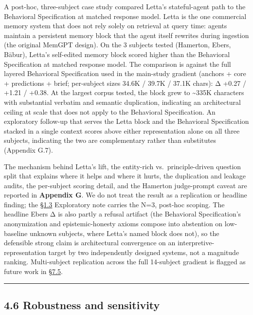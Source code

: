 A post-hoc, three-subject case study compared Letta's stateful-agent
path to the Behavioral Specification at matched response model. Letta is
the one commercial memory system that does not rely solely on retrieval
at query time: agents maintain a persistent memory block that the agent
itself rewrites during ingestion (the original MemGPT design). On the 3
subjects tested (Hamerton, Ebers, Bābur), Letta's self-edited memory
block scored higher than the Behavioral Specification at matched
response model. The comparison is against the full layered Behavioral
Specification used in the main-study gradient (anchors + core +
predictions + brief; per-subject sizes 34.6K / 39.7K / 37.1K chars): Δ
+0.27 / +1.21 / +0.38. At the largest corpus tested, the block grew to
\textasciitilde335K characters with substantial verbatim and semantic
duplication, indicating an architectural ceiling at scale that does not
apply to the Behavioral Specification. An exploratory follow-up that
serves the Letta block and the Behavioral Specification stacked in a
single context scores above either representation alone on all three
subjects, indicating the two are complementary rather than substitutes
(Appendix G.7).

The mechanism behind Letta's lift, the entity-rich vs.~principle-driven
question split that explains where it helps and where it hurts, the
duplication and leakage audits, the per-subject scoring detail, and the
Hamerton judge-prompt caveat are reported in \textbf{Appendix G}. We do
not treat the result as a replication or headline finding; the \hyperref[what-we-found]{§1.3}
Exploratory note carries the N=3, post-hoc scoping. The headline Ebers Δ
is also partly a refusal artifact (the Behavioral Specification's
anonymization and epistemic-honesty axioms compose into abstention on
low-baseline unknown subjects, where Letta's named block does not), so
the defensible strong claim is architectural convergence on an
interpretive-representation target by two independently designed
systems, not a magnitude ranking. Multi-subject replication across the
full 14-subject gradient is flagged as future work in \hyperref[stateful-agent-implementations-and-temporal-drift-tracking]{§7.5}.

\begin{center}\rule{0.5\linewidth}{0.5pt}\end{center}

\hypertarget{robustness-and-sensitivity}{%
\subsection{4.6 Robustness and
sensitivity}\label{robustness-and-sensitivity}}

